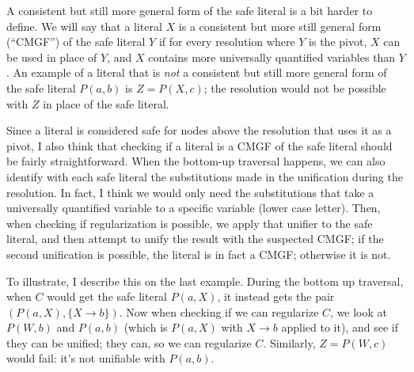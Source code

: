 \documentclass[12pt]{article}
\theoremstyle{definition}
\theoremstyle{remark}
\begin{document}
A consistent but still more general form of the safe literal is a bit harder to define. We will say that a literal $X$ is a consistent but more still general form (``CMGF'') of the safe literal $Y$ if for every resolution where $Y$ is the pivot, $X$ can be used in place of $Y$, and $X$ contains more universally quantified variables than $Y$. An example of a literal that is \emph{not} a consistent but still more general form of the safe literal $P(a,b)$ is $Z=P(X,c)$; the resolution would not be possible with $Z$ in place of the safe literal.

Since a literal is considered safe for nodes above the resolution that uses it as a pivot, I also think that checking if a literal is a CMGF of the safe literal should be fairly straightforward. When the bottom-up traversal happens, we can also identify with each safe literal the substitutions made in the unification during the resolution. In fact, I think we would only need the substitutions that take a universally quantified variable to a specific variable (lower case letter). Then, when checking if regularization is possible, we apply that unifier to the safe literal, and then attempt to unify the result with the suspected CMGF; if the second unification is possible, the literal is in fact a CMGF; otherwise it is not. 

To illustrate, I describe this on the last example. During the bottom up traversal, when $C$ would get the safe literal $P(a,X)$, it instead gets the pair $(P(a,X),\{X \rightarrow b\})$. Now when checking if we can regularize $C$, we look at $P(W,b)$ and $P(a,b)$ (which is $P(a,X)$ with $X \rightarrow b$ applied to it), and see if they can be unified; they can, so we can regularize $C$. Similarly, $Z=P(W,c)$ would fail: it's not unifiable with $P(a,b)$.
\end{document}
